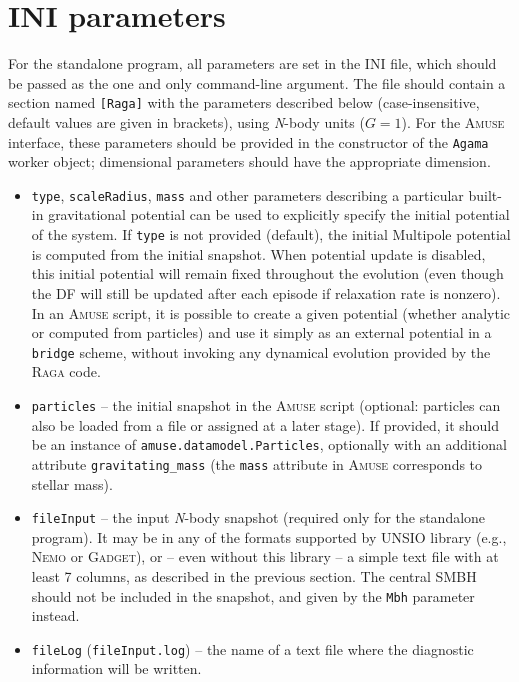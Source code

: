 \documentclass[12pt]{article}
\newcommand{\Nbody}{\textsl{N}-body\xspace}
\newcommand{\Raga}{\textsc{Raga}\xspace}
\newcommand{\Amuse}{\textsc{Amuse}\xspace}
\newcommand{\Nemo}{\textsc{Nemo}\xspace}
\begin{document}
\section{INI parameters}

For the standalone program, all parameters are set in the INI file, which should be passed as the one and only command-line argument. The file should contain a section named \texttt{[Raga]} with the parameters described below (case-insensitive, default values are given in brackets), using \Nbody units ($G=1$). For the \Amuse interface, these parameters should be provided in the constructor of the \texttt{Agama} worker object; dimensional parameters should have the appropriate dimension.
\begin{itemize}
\item \texttt{type}, \texttt{scaleRadius}, \texttt{mass} and other parameters describing a particular built-in gravitational potential can be used to explicitly specify the initial potential of the system. If \texttt{type} is not provided (default), the initial Multipole potential is computed from the initial snapshot. When potential update is disabled, this initial potential will remain fixed throughout the evolution (even though the DF will still be updated after each episode if relaxation rate is nonzero).\\
In an \Amuse script, it is possible to create a given potential (whether analytic or computed from particles) and use it simply as an external potential in a \texttt{bridge} scheme, without invoking any dynamical evolution provided by the \Raga code.
\item \texttt{particles}  -- the initial snapshot in the \Amuse script (optional: particles can also be loaded from a file or assigned at a later stage). If provided, it should be an instance of \texttt{amuse.datamodel.Particles}, optionally with an additional attribute \texttt{gravitating_mass} (the \texttt{mass} attribute in \Amuse corresponds to stellar mass).
\item \texttt{fileInput}  -- the input \Nbody snapshot (required only for the standalone program).
It may be in any of the formats supported by UNSIO library (e.g., \Nemo or \textsc{Gadget}), or -- even without this library -- a simple text file with at least 7 columns, as described in the previous section. The central SMBH should not be included in the snapshot, and given by the \texttt{Mbh} parameter instead.
\item \texttt{fileLog}  (\texttt{fileInput.log}) -- the name of a text file where the diagnostic information will be written.

\end{itemize}
\end{document}
